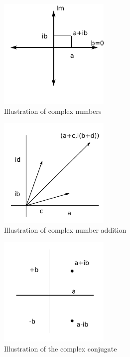 \documentclass[a4paper,landscape,twocolumn]{article}
\begin{document}
\begin{figure}[!ht]
  \begin{center}
    \includegraphics[width=200px]{img/complex_numbers_illustration.pdf}
    \caption{Illustration of complex numbers}
  \end{center}
\end{figure}
\begin{figure}[!ht]
  \begin{center}
    \includegraphics[width=200px]{img/complex_numbers_addition.pdf}
    \caption{Illustration of complex number addition}
  \end{center}
\end{figure}
\begin{figure}[!ht]
  \begin{center}
    \includegraphics[width=200px]{img/complex_numbers_conjugate.pdf}
    \caption{Illustration of the complex conjugate}
  \end{center}
\end{figure}
\end{document}
